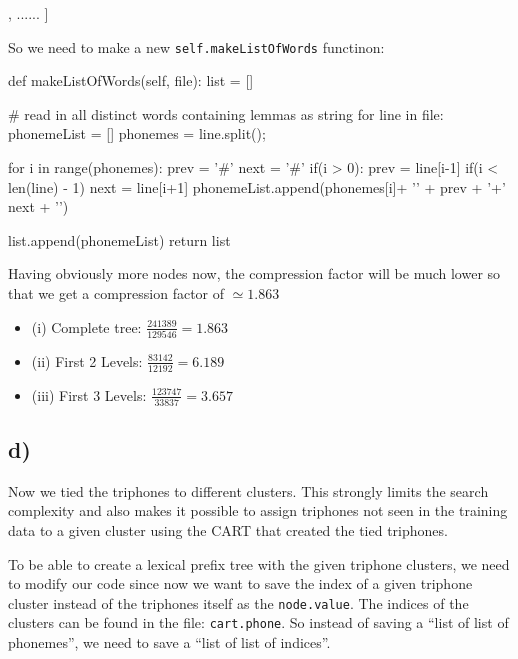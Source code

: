 \begin{python}
[
	['jh{#+uw}','uw{jh+l}','l{uw+#}'],
	......
]
\end{python}

So we need to make a new \lstinline|self.makeListOfWords| functinon:

\begin{python}
def makeListOfWords(self, file):
		list = []

		# read in all distinct words containing lemmas as string
		for line in file:
			phonemeList = []
			phonemes = line.split();

			for i in range(phonemes):
				prev = '#'
				next = '#'
				if(i > 0):
					prev = line[i-1]
				if(i < len(line) - 1)
					next = line[i+1]
				phonemeList.append(phonemes[i]+ '{' + prev + '+' next + '}')

			list.append(phonemeList)
		return list
\end{python}

Having obviously more nodes now, the compression factor will be 
much lower so that we get a compression factor of $\simeq 1.863$


\begin{itemize}
	\item (i) Complete tree: $\frac{241389}{129546} = 1.863$
	\item (ii) First 2 Levels: $\frac{83142}{12192} = 6.189$
	\item (iii) First 3 Levels: $\frac{123747}{33837} = 3.657$
\end{itemize}


\subsection*{d)} %
\label{sub:d_}

Now we tied the triphones to different clusters. This strongly limits the search complexity and also makes it possible to 
assign triphones not seen in the training data to a given cluster using the CART that created the tied triphones. 

To be able to create a lexical prefix tree with the given triphone clusters, we need to modify our code since now we want to 
save the index of a given triphone cluster instead of the triphones itself as the \lstinline|node.value|. The indices of the clusters can be found in the file: 
\lstinline|cart.phone|. So instead of saving a ``list of list of phonemes'', we need to save a ``list of list of indices''.

